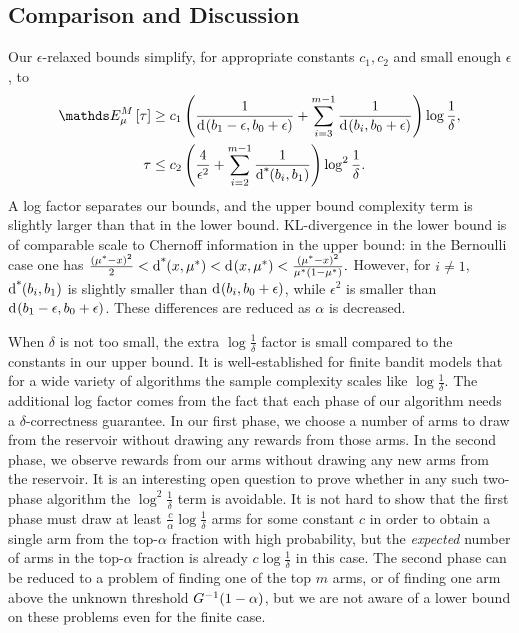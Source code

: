\subsection{Comparison and Discussion}
\label{sec-compare-lb-ub}

Our $\epsilon$-relaxed bounds simplify,
for appropriate constants $c_1,c_2$ and small enough $\epsilon$, to
\begin{align*}
\ETrueModel{ \tau } & \ge c_1 \left(
	\frac{1}{\ArmKL{b_1-\epsilon}{b_0+\epsilon}}
	+ \sum_{i=3}^{m-1} \frac{1}{\ArmKL{b_i}{b_0 + \epsilon}}
\right) \log \frac{1}{\delta},
\\
\tau &\le
c_2 \left( 
  \frac{4}{\epsilon^2}
  + \sum_{i=2}^{m-1} \frac{1}{\ArmCI{b_{i}}{b_1}}
\right) \log^2 \frac{1}{\delta}.
\end{align*}
A log factor separates our bounds,
and the upper bound complexity term is slightly
larger than that in the lower bound.
KL-divergence in the lower bound is of comparable scale to Chernoff information in the upper bound:  in the Bernoulli case one has 
$
\frac{(\mu^*-x)^2}{2} < \operatorname{d^*}\hspace{-.2em}\left( x, \mu^* \right)
	< \operatorname{d}\hspace{-.1em}\left( x, \mu^* \right)
	< \frac{(\mu^* - x)^2}{\mu^*(1-\mu^*)}.
$
However, for $i\neq 1$, $\operatorname{d^*}\hspace{-.2em}\left( b_i, b_1 \right)$ is slightly smaller than $\operatorname{d}\hspace{-.1em}\left( b_i, b_0 + \epsilon \right)$,
while $\epsilon^2$ is smaller than $\operatorname{d}\hspace{-.1em}\left( b_1-\epsilon, b_0+\epsilon \right)$. 
These differences are reduced as $\alpha$ is decreased.

When $\delta$ is not too small, the extra $\log \frac{1}{\delta}$ factor is small compared to the constants in our upper bound.
It is well-established 
for finite bandit models that for a wide variety of
algorithms the sample complexity 
scales like
$\log \frac{1}{\delta}$. The additional log factor comes from the fact that each phase of our algorithm needs a $\delta$-correctness
guarantee.
In our first phase, we choose a number of arms to draw from the reservoir
without drawing any rewards from those arms.
In the second phase, we observe rewards from our arms without drawing any new
arms from the reservoir.
It is an interesting open question to prove whether in any such two-phase algorithm the
$\log^2 \frac{1}{\delta}$ term is avoidable.
It is not hard to show that the first phase must draw at least $\frac{c}{\alpha} \log \frac{1}{\delta}$ arms for some constant $c$ in order to obtain a single arm from the top-$\alpha$ fraction with high probability, but the \emph{expected} number of arms in the top-$\alpha$ fraction is already $c \log \frac{1}{\delta}$ in this case.
The second phase can be reduced to a problem of finding one of the top $m$ arms, or of finding one arm above the unknown threshold $G^{-1}(1 - \alpha)$, but we are not aware of a lower bound on these problems even for the finite case.

